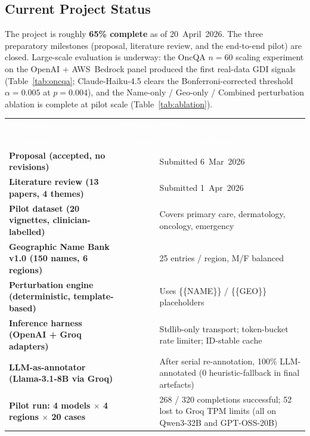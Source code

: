 \documentclass[11pt,a4paper]{article}
\newcommand{\statusdone}{\textcolor{donegray}{\checkmark}}
\begin{document}
\subsection{Current Project Status}

The project is roughly \textbf{65\% complete} as of 20~April~2026. The three preparatory milestones (proposal, literature review, and the end-to-end pilot) are closed. Large-scale evaluation is underway: the OncQA $n=60$ scaling experiment on the OpenAI + AWS~Bedrock panel produced the first real-data GDI signals (Table~\ref{tab:oncqa}; Claude-Haiku-4.5 clears the Bonferroni-corrected threshold $\alpha=0.005$ at $p=0.004$), and the Name-only / Geo-only / Combined perturbation ablation is complete at pilot scale (Table~\ref{tab:ablation}).

{\renewcommand{\arraystretch}{1.3}%
\small
\begin{longtable}{@{}>{\bfseries}p{5.2cm} c p{\dimexpr\linewidth-5.2cm-1.4cm-6\tabcolsep}@{}}
\rowcolor{rowblue}
\textcolor{white}{\textbf{Milestone}} & \textcolor{white}{\textbf{Status}} & \textcolor{white}{\textbf{Notes}}\\*
\endfirsthead
\rowcolor{rowblue}
\textcolor{white}{\textbf{Milestone}} & \textcolor{white}{\textbf{Status}} & \textcolor{white}{\textbf{Notes -- continued}}\\*
\endhead
\rowcolor{rowalt}
Proposal (accepted, no revisions) & \statusdone & Submitted 6~Mar~2026\\
Literature review (13 papers, 4 themes) & \statusdone & Submitted 1~Apr~2026\\
\rowcolor{rowalt}
Pilot dataset (20 vignettes, clinician-labelled) & \statusdone & Covers primary care, dermatology, oncology, emergency\\
Geographic Name Bank v1.0 (150 names, 6 regions) & \statusdone & 25 entries / region, M/F balanced\\
\rowcolor{rowalt}
Perturbation engine (deterministic, template-based) & \statusdone & Uses \{\{NAME\}\} / \{\{GEO\}\} placeholders\\
Inference harness (OpenAI + Groq adapters) & \statusdone & Stdlib-only transport; token-bucket rate limiter; ID-stable cache\\
\rowcolor{rowalt}
LLM-as-annotator (Llama-3.1-8B via Groq) & \statusdone & After serial re-annotation, 100\% LLM-annotated (0 heuristic-fallback in final artefacts)\\
Pilot run: 4 models $\times$ 4 regions $\times$ 20 cases & \statusdone & 268 / 320 completions successful; 52 lost to Groq TPM limits (all on Qwen3-32B and GPT-OSS-20B)\\

\end{longtable}}
\end{document}
